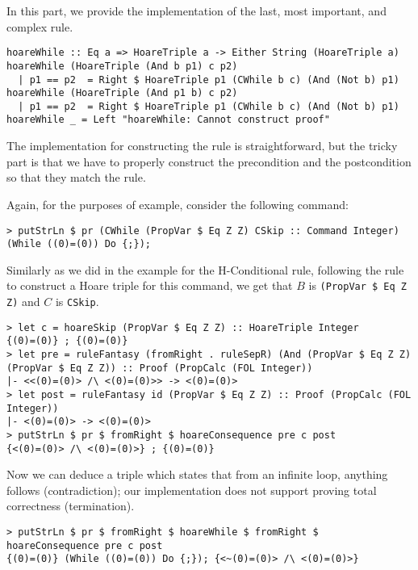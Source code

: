 \documentclass{article}
\begin{document}
In this part, we provide the implementation of the last, most important, and complex rule.

\begin{lstlisting}
hoareWhile :: Eq a => HoareTriple a -> Either String (HoareTriple a)
hoareWhile (HoareTriple (And b p1) c p2)
  | p1 == p2  = Right $ HoareTriple p1 (CWhile b c) (And (Not b) p1)
hoareWhile (HoareTriple (And p1 b) c p2)
  | p1 == p2  = Right $ HoareTriple p1 (CWhile b c) (And (Not b) p1)
hoareWhile _ = Left "hoareWhile: Cannot construct proof"
\end{lstlisting}

The implementation for constructing the rule is straightforward, but the tricky part is that we have to properly construct the precondition and the postcondition so that they match the rule.

Again, for the purposes of example, consider the following command:

\begin{lstlisting}
> putStrLn $ pr (CWhile (PropVar $ Eq Z Z) CSkip :: Command Integer)
(While ((0)=(0)) Do {;});
\end{lstlisting}

Similarly as we did in the example for the H-Conditional rule, following the rule to construct a Hoare triple for this command, we get that $B$ is \texttt{(PropVar \$ Eq Z Z)} and $C$ is \texttt{CSkip}.

\begin{lstlisting}
> let c = hoareSkip (PropVar $ Eq Z Z) :: HoareTriple Integer
{(0)=(0)} ; {(0)=(0)}
> let pre = ruleFantasy (fromRight . ruleSepR) (And (PropVar $ Eq Z Z) (PropVar $ Eq Z Z)) :: Proof (PropCalc (FOL Integer))
|- <<(0)=(0)> /\ <(0)=(0)>> -> <(0)=(0)>
> let post = ruleFantasy id (PropVar $ Eq Z Z) :: Proof (PropCalc (FOL Integer))
|- <(0)=(0)> -> <(0)=(0)>
> putStrLn $ pr $ fromRight $ hoareConsequence pre c post
{<(0)=(0)> /\ <(0)=(0)>} ; {(0)=(0)}
\end{lstlisting}

Now we can deduce a triple which states that from an infinite loop, anything follows (contradiction); our implementation does not support proving total correctness (termination).

\begin{lstlisting}
> putStrLn $ pr $ fromRight $ hoareWhile $ fromRight $ hoareConsequence pre c post
{(0)=(0)} (While ((0)=(0)) Do {;}); {<~(0)=(0)> /\ <(0)=(0)>}
\end{lstlisting}
\end{document}
